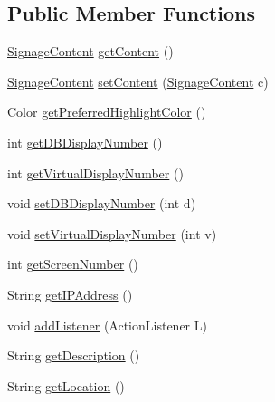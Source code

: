 \subsection*{Public Member Functions}
\begin{DoxyCompactItemize}
\item 
\hyperlink{interfacegov_1_1fnal_1_1ppd_1_1dd_1_1signage_1_1SignageContent}{Signage\-Content} \hyperlink{interfacegov_1_1fnal_1_1ppd_1_1dd_1_1signage_1_1Display_ab5979ea942bdd40fb9ea00375eccde78}{get\-Content} ()
\item 
\hyperlink{interfacegov_1_1fnal_1_1ppd_1_1dd_1_1signage_1_1SignageContent}{Signage\-Content} \hyperlink{interfacegov_1_1fnal_1_1ppd_1_1dd_1_1signage_1_1Display_a703f091805d557d9866d520a32d73929}{set\-Content} (\hyperlink{interfacegov_1_1fnal_1_1ppd_1_1dd_1_1signage_1_1SignageContent}{Signage\-Content} c)
\item 
Color \hyperlink{interfacegov_1_1fnal_1_1ppd_1_1dd_1_1signage_1_1Display_adc3c8118f22dd4d82c837da04a88723f}{get\-Preferred\-Highlight\-Color} ()
\item 
int \hyperlink{interfacegov_1_1fnal_1_1ppd_1_1dd_1_1signage_1_1Display_a16cd7303182205627ccffe5024e041d9}{get\-D\-B\-Display\-Number} ()
\item 
int \hyperlink{interfacegov_1_1fnal_1_1ppd_1_1dd_1_1signage_1_1Display_a5f3b01b971133b1278f6c80b1aed58e5}{get\-Virtual\-Display\-Number} ()
\item 
void \hyperlink{interfacegov_1_1fnal_1_1ppd_1_1dd_1_1signage_1_1Display_a97b825cca932ae53677073f95a0f93bd}{set\-D\-B\-Display\-Number} (int d)
\item 
void \hyperlink{interfacegov_1_1fnal_1_1ppd_1_1dd_1_1signage_1_1Display_a7c166488b81af34ad8c64868556ec38e}{set\-Virtual\-Display\-Number} (int v)
\item 
int \hyperlink{interfacegov_1_1fnal_1_1ppd_1_1dd_1_1signage_1_1Display_aebf42d7e0cbc3e6f0a4009bb61ddfdfb}{get\-Screen\-Number} ()
\item 
String \hyperlink{interfacegov_1_1fnal_1_1ppd_1_1dd_1_1signage_1_1Display_afd6500b33d87915eb5f09df692141000}{get\-I\-P\-Address} ()
\item 
void \hyperlink{interfacegov_1_1fnal_1_1ppd_1_1dd_1_1signage_1_1Display_abbf3b133460808b9361107fcd5a3ae19}{add\-Listener} (Action\-Listener L)
\item 
String \hyperlink{interfacegov_1_1fnal_1_1ppd_1_1dd_1_1signage_1_1Display_afdd0f4294902140944f4aff8b8bc94d0}{get\-Description} ()
\item 
String \hyperlink{interfacegov_1_1fnal_1_1ppd_1_1dd_1_1signage_1_1Display_a569a001d11cb30ff98590241d05d88b9}{get\-Location} ()

\end{DoxyCompactItemize}
